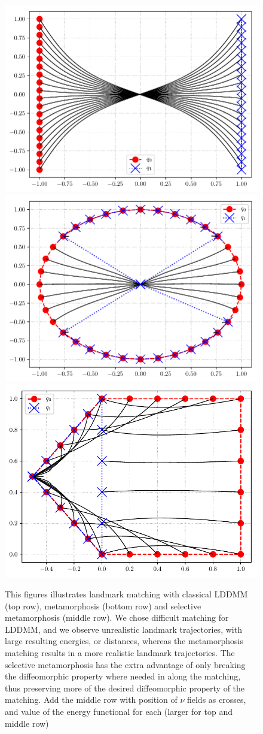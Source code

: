 \documentclass[runningheads]{llncs}
\begin{document}
\begin{figure}
\begin{minipage}{\textwidth}
    \includegraphics[width=.3\textwidth]{mm_criss_cross.pdf}\quad
    \includegraphics[width=.3\textwidth]{mm_squeeze.pdf}\quad
    \includegraphics[width=.291\textwidth]{mm_pent_to_tri.pdf}
    \caption{This figures illustrates landmark matching with classical LDDMM
    (top row), metamorphosis (bottom row) and selective metamorphosis (middle
    row).  We chose difficult matching for LDDMM, and we observe unrealistic
    landmark trajectories, with large resulting energies, or distances, whereas
    the metamorphosis  matching results in a more realistic landmark
    trajectories.  The selective metamorphosis has the extra advantage of only
    breaking the diffeomorphic property where needed in along the matching, thus
    preserving more of the desired diffeomorphic property of the matching.
    {\color{red} Add the middle row with position of $\nu$ fields as crosses,
    and value of the energy functional for each (larger for top and middle
    row)}}
    \label{fig:mm_lddmm}
\end{minipage}
\end{figure}

\end{document}
